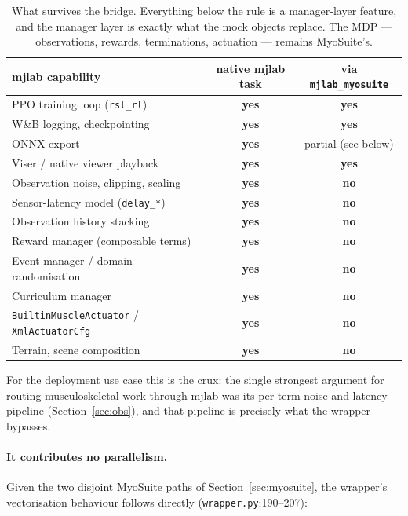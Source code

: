 \documentclass[11pt,a4paper]{article}
\newcommand{\yes}{\textbf{yes}}
\newcommand{\no}{no}
\begin{document}
\begin{table}[h!]
\centering
\small
\begin{tabular}{@{}L{5.6cm}cc@{}}
\toprule
mjlab capability & native mjlab task & via \texttt{mjlab\_myosuite} \\
\midrule
PPO training loop (\texttt{rsl\_rl})        & \yes & \yes \\
W\&B logging, checkpointing                 & \yes & \yes \\
ONNX export                                 & \yes & partial (see below) \\
Viser / native viewer playback              & \yes & \yes \\
\midrule
Observation noise, clipping, scaling        & \yes & \textbf{\no} \\
Sensor-latency model (\texttt{delay\_*})    & \yes & \textbf{\no} \\
Observation history stacking                & \yes & \textbf{\no} \\
Reward manager (composable terms)           & \yes & \textbf{\no} \\
Event manager / domain randomisation        & \yes & \textbf{\no} \\
Curriculum manager                          & \yes & \textbf{\no} \\
\texttt{BuiltinMuscleActuator} / \texttt{XmlActuatorCfg} & \yes & \textbf{\no} \\
Terrain, scene composition                  & \yes & \textbf{\no} \\
\bottomrule
\end{tabular}
\caption{What survives the bridge. Everything below the rule is a manager-layer feature,
and the manager layer is exactly what the mock objects replace. The MDP --- observations,
rewards, terminations, actuation --- remains MyoSuite's.}
\end{table}

\noindent
For the deployment use case this is the crux: the single strongest argument for routing
musculoskeletal work through mjlab was its per-term noise and latency pipeline
(Section~\ref{sec:obs}), and that pipeline is precisely what the wrapper bypasses.

\paragraph{It contributes no parallelism.} Given the two disjoint MyoSuite paths of
Section~\ref{sec:myosuite}, the wrapper's vectorisation behaviour follows directly
(\texttt{wrapper.py}:190--207):
\end{document}
